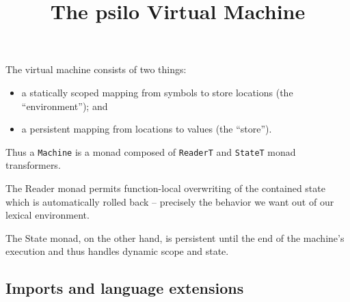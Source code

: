 \documentclass[]{article}
\title{The psilo Virtual Machine}
\date{}
\begin{document}
\maketitle

The virtual machine consists of two things:

\begin{itemize}
\itemsep1pt\parskip0pt
\item
  a statically scoped mapping from symbols to store locations (the
  ``environment''); and
\item
  a persistent mapping from locations to values (the ``store'').
\end{itemize}

Thus a \texttt{Machine} is a monad composed of \texttt{ReaderT} and
\texttt{StateT} monad transformers.

The Reader monad permits function-local overwriting of the contained
state which is automatically rolled back -- precisely the behavior we
want out of our lexical environment.

The State monad, on the other hand, is persistent until the end of the
machine's execution and thus handles dynamic scope and state.

\subsection{Imports and language
extensions}\label{imports-and-language-extensions}
\end{document}
